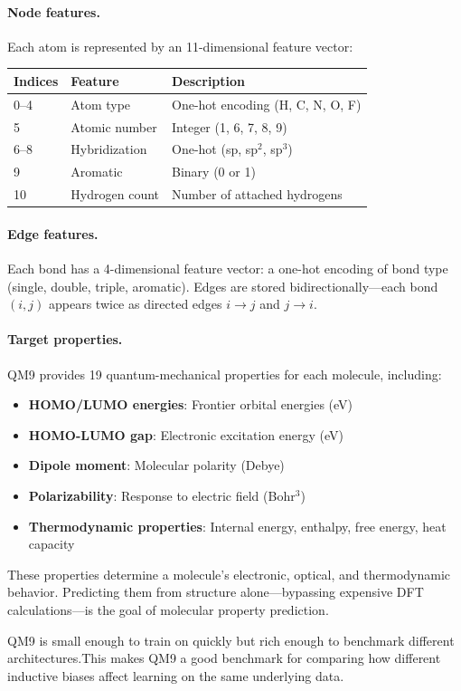 \documentclass[11pt]{article}
\begin{document}
\paragraph{Node features.} Each atom is represented by an 11-dimensional feature vector:
\begin{center}
\begin{tabular}{lll}
\toprule
\textbf{Indices} & \textbf{Feature} & \textbf{Description} \\
\midrule
0--4 & Atom type & One-hot encoding (H, C, N, O, F) \\
5 & Atomic number & Integer (1, 6, 7, 8, 9) \\
6--8 & Hybridization & One-hot (sp, sp$^2$, sp$^3$) \\
9 & Aromatic & Binary (0 or 1) \\
10 & Hydrogen count & Number of attached hydrogens \\
\bottomrule
\end{tabular}
\end{center}

\paragraph{Edge features.} Each bond has a 4-dimensional feature vector: a one-hot encoding of bond type (single, double, triple, aromatic). Edges are stored bidirectionally---each bond $(i,j)$ appears twice as directed edges $i \to j$ and $j \to i$.

\paragraph{Target properties.} QM9 provides 19 quantum-mechanical properties for each molecule, including:
\begin{itemize}
    \item \textbf{HOMO/LUMO energies}: Frontier orbital energies (eV)
    \item \textbf{HOMO-LUMO gap}: Electronic excitation energy (eV)
    \item \textbf{Dipole moment}: Molecular polarity (Debye)
    \item \textbf{Polarizability}: Response to electric field (Bohr$^3$)
    \item \textbf{Thermodynamic properties}: Internal energy, enthalpy, free energy, heat capacity
\end{itemize}
These properties determine a molecule's electronic, optical, and thermodynamic behavior. Predicting them from structure alone---bypassing expensive DFT calculations---is the goal of molecular property prediction.

QM9 is small enough to train on quickly but rich enough to benchmark different architectures.This makes QM9 a good benchmark for comparing how different inductive biases affect learning on the same underlying data.
\end{document}
